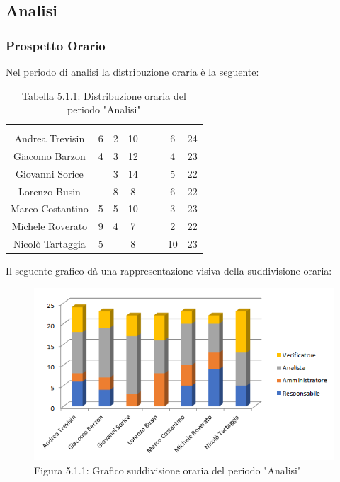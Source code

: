 \subsection{Analisi}

\subsubsection{Prospetto Orario}
Nel periodo di analisi la distribuzione oraria è la seguente:

\renewcommand{\arraystretch}{1.4}
\begin{table}[H]
\begin{center}
\begin{tabular}{|c|c|c|c|c|c|c|c|}
\hline
\rowcolor{title_row}
\textbf{\color{title_text}{Nome}} & \textbf{\color{title_text}{Resp.}} & \textbf{\color{title_text}{Ammi.}} & \textbf{\color{title_text}{Analist.}} & \textbf{\color{title_text}{Progett.}} & \textbf{\color{title_text}{Program.}} & \textbf{\color{title_text}{Verific.}} & \textbf{\color{title_text}{Totale}} \\ \hline
Andrea Trevisin  & 6 & 2 & 10 & & & 6 & 24  \\ \hline
Giacomo Barzon   & 4 & 3 & 12 & & & 4 & 23  \\ \hline
Giovanni Sorice  & & 3 & 14 & & & 5 & 22  \\ \hline
Lorenzo Busin    & & 8 & 8 & & & 6 & 22  \\ \hline
Marco Costantino & 5 & 5 & 10 & & & 3 & 23 \\ \hline
Michele Roverato & 9 & 4 & 7 & & & 2 & 22 \\ \hline
Nicolò Tartaggia & 5 & & 8 & & & 10 & 23  \\ \hline
\end{tabular}
\caption{Tabella 5.1.1: Distribuzione oraria del periodo "Analisi"\label{}}
\end{center}
\end{table}
\renewcommand{\arraystretch}{1}

Il seguente grafico dà una rappresentazione visiva della suddivisione oraria: \\
\begin{figure} [H]
	\centering
	\includegraphics[scale=0.8]{Res/ExcelGrafici/Grafici/AnalisiOre.png}
	\caption{Figura 5.1.1: Grafico suddivisione oraria del periodo "Analisi"}\label{}
\end{figure}


